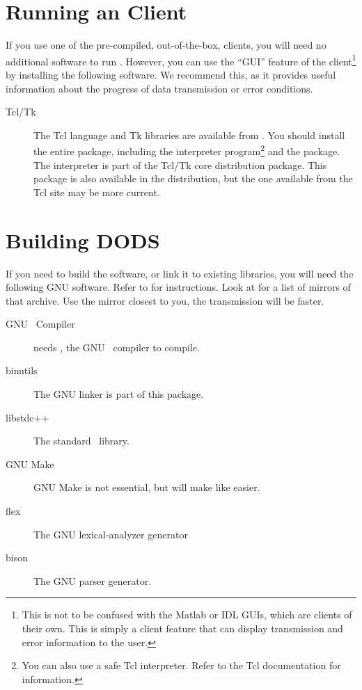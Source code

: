 \section{Running an \opendap Client}

If you use one of the pre-compiled, out-of-the-box, \opendap clients, you
will need no additional software to run \opendap.  However, you can use
the ``GUI'' feature of the \opendap client\footnote{This is not to be
  confused with the \opendap Matlab or IDL GUIs, which are clients of
  their own.  This is simply a client feature that can display
  transmission and error information to the user.} by installing the
following software.  We recommend this, as it provides useful
information about the progress of data transmission or error conditions.

\begin{description}
\item[Tcl/Tk] The Tcl language and Tk libraries are available from
  . You
  should install the entire package, including the 
  interpreter program\footnote{You can also use a safe Tcl
    interpreter.  Refer to the Tcl documentation for information.} and
  the  package.  The  interpreter is
  part of the Tcl/Tk core distribution package.  This package is also
  available in the \opendap distribution, but the one available from the
  Tcl site may be more current.
\end{description}

\section{Building DODS}

If you need to build the \opendap software, or link it to existing
libraries, you will need the following GNU software.
Refer to  for
instructions.  Look at
for a list of mirrors of that archive.  Use the mirror closest
to you, the transmission will be faster.

\begin{description}
\item[GNU \Cpp\ Compiler] \opendap needs , the GNU \Cpp\ compiler
  to compile.
\item[binutils] The GNU linker is part of this package.
\item[libstdc++] The standard \Cpp\ library.
\item[GNU Make] GNU Make is not essential, but will make like easier.
\item[flex] The GNU lexical-analyzer generator
\item[bison] The GNU parser generator.
\end{description}

%
%
%
%


